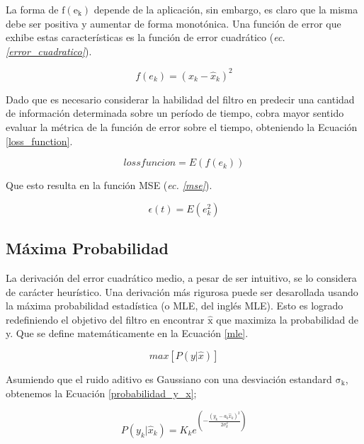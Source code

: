 \documentclass[10pt, a4paper]{article}
\begin{document}
La forma de $\mathrm{f(e_k)}$ depende de la aplicaci\'on, sin embargo, es claro
que la misma debe ser positiva y aumentar de forma monot\'onica. Una funci\'on
de error que exhibe estas caracter\'isticas es la funci\'on de error
cuadr\'atico (\emph{ec. \ref{error_cuadratico}}).

\begin{equation}
    f(e_k) = (x_k - \hat{x}_k)^2 \label{error_cuadratico}
\end{equation}

Dado que es necesario considerar la habilidad del filtro en predecir una
cantidad de informaci\'on determinada sobre un per\'iodo de tiempo, cobra mayor
sentido evaluar la m\'etrica de la funci\'on de error sobre el tiempo,
obteniendo la Ecuaci\'on \ref{loss_function}.

\begin{equation}
    lossfuncion = E\left(f(e_k)\right) \label{loss_function}
\end{equation}

Que esto resulta en la funci\'on \acrshort{MSE} (\emph{ec. \ref{mse}}).

\begin{equation}
    \epsilon(t) = E(e^2_k) \label{mse}
\end{equation}

\subsection{M\'axima Probabilidad}\label{maximum_likelihood_section}

La derivaci\'on del error cuadr\'atico medio, a pesar de ser intuitivo, se lo
considera de car\'acter heur\'istico. Una derivaci\'on m\'as rigurosa puede ser
desarollada usando la m\'axima probabilidad estad\'istica (o \acrshort{MLE}, del
ingl\'es \acrlong{MLE}). Esto es logrado redefiniendo el objetivo del filtro en
encontrar $\mathrm{\hat{x}}$ que maximiza la probabilidad de y. Que se define
matem\'aticamente en la Ecuaci\'on \ref{mle}.

\begin{equation}
    max\left[P\left(y|\hat{x}\right)\right] \label{mle}
\end{equation}

Asumiendo que el ruido aditivo es Gaussiano con una desviaci\'on estandard
$\mathrm{\sigma_k}$, obtenemos la Ecuaci\'on \ref{probabilidad_y_x};

\begin{equation}
    P\left(y_k|\hat{x}_k\right) = K_ke^{\left(- \frac{(y_k - a_k\hat{x}_k)^2}{2\sigma^2_k}\right)} \label{probabilidad_y_x}
\end{equation}
\end{document}
